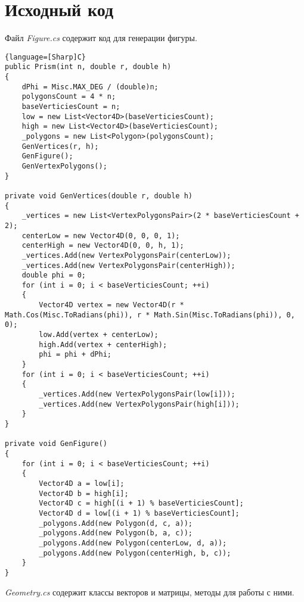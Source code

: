 \section{Исходный код}

Файл \textit{Figure.cs} содержит код для генерации фигуры.

\begin{lstlisting}{language=[Sharp]C}
public Prism(int n, double r, double h)
{
    dPhi = Misc.MAX_DEG / (double)n;
    polygonsCount = 4 * n;
    baseVerticiesCount = n;
    low = new List<Vector4D>(baseVerticiesCount);
    high = new List<Vector4D>(baseVerticiesCount);
    _polygons = new List<Polygon>(polygonsCount);
    GenVertices(r, h);
    GenFigure();
    GenVertexPolygons();
}

private void GenVertices(double r, double h)
{
    _vertices = new List<VertexPolygonsPair>(2 * baseVerticiesCount + 2);
    centerLow = new Vector4D(0, 0, 0, 1);
    centerHigh = new Vector4D(0, 0, h, 1);
    _vertices.Add(new VertexPolygonsPair(centerLow));
    _vertices.Add(new VertexPolygonsPair(centerHigh));
    double phi = 0;
    for (int i = 0; i < baseVerticiesCount; ++i)
    {
        Vector4D vertex = new Vector4D(r * Math.Cos(Misc.ToRadians(phi)), r * Math.Sin(Misc.ToRadians(phi)), 0, 0);
        low.Add(vertex + centerLow);
        high.Add(vertex + centerHigh);
        phi = phi + dPhi;
    }
    for (int i = 0; i < baseVerticiesCount; ++i)
    {
        _vertices.Add(new VertexPolygonsPair(low[i]));
        _vertices.Add(new VertexPolygonsPair(high[i]));
    }
}

private void GenFigure()
{
    for (int i = 0; i < baseVerticiesCount; ++i)
    {
        Vector4D a = low[i];
        Vector4D b = high[i];
        Vector4D c = high[(i + 1) % baseVerticiesCount];
        Vector4D d = low[(i + 1) % baseVerticiesCount];
        _polygons.Add(new Polygon(d, c, a));
        _polygons.Add(new Polygon(b, a, c));
        _polygons.Add(new Polygon(centerLow, d, a));
        _polygons.Add(new Polygon(centerHigh, b, c));
    }
}
\end{lstlisting}

\textit{Geometry.cs} содержит классы векторов и матрицы, методы для работы с ними.

